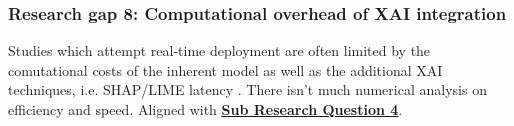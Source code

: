 
\subsubsection*{Research gap 8: Computational overhead of XAI integration}\label{research-gap-8}
Studies which attempt real-time deployment are often limited by the comutational costs of the inherent model as well as the additional XAI techniques, i.e. SHAP/LIME latency \citep{kapoor2024comparative}. There isn't much numerical analysis on efficiency and speed. Aligned with \hyperref[sub-research-q4]{\uline{\textbf{Sub Research Question 4}}}.
